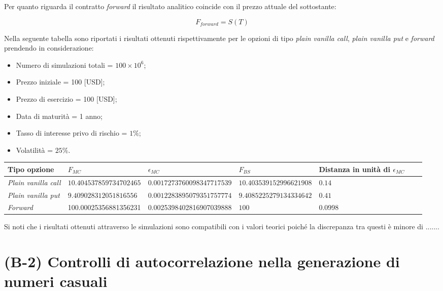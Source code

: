 Per quanto riguarda il contratto \textit{forward} il risultato analitico coincide con il prezzo attuale del sottostante:

\begin{equation}
    F_{forward}=S(T) 
\end{equation}

Nella seguente tabella sono riportati i risultati ottenuti rispettivamente per le opzioni di tipo \textit{plain vanilla call}, \textit{plain vanilla put} e \textit{forward} prendendo in considerazione:
\begin{itemize}
    \item Numero di simulazioni totali = $100 \times 10^6$;
    \item Prezzo iniziale = 100 [USD];
    \item Prezzo di esercizio = 100 [USD];
    \item Data di maturità = 1 anno; 
    \item Tasso di interesse privo di rischio = $1\%$;
    \item Volatilità = $25\%$.
\end{itemize}

\begin{table}
\small
\centering
\begin{tabular}{|l||l|l|l|l|l|l|}
\hline
\textbf{Tipo opzione} & $F_{MC}$ & $\epsilon_{MC}$ & $F_{BS}$ & Distanza in unità di $\epsilon_{MC}$ \\
\hline \hline
\textit{Plain vanilla call} & $10.404537859734702465$ & $0.0017273760098347717539$ &
$10.403539152996621908$ & $0.14$\\ \hline
\textit{Plain vanilla put} & $9.409028312051816556$ & $0.0012283895079351757774$ & $9.4085225279134334642$ & $0.41$\\ \hline
\textit{Forward} & 100.00025356881356231 & 0.0025398402816907039888 & $100$ & 0.0998\\ \hline
\end{tabular}
\end{table}

Si noti che i risultati ottenuti attraverso le simulazioni sono compatibili con i valori teorici poiché la discrepanza tra questi è minore di .......

\section{(B-2) Controlli di autocorrelazione nella generazione di numeri casuali}

